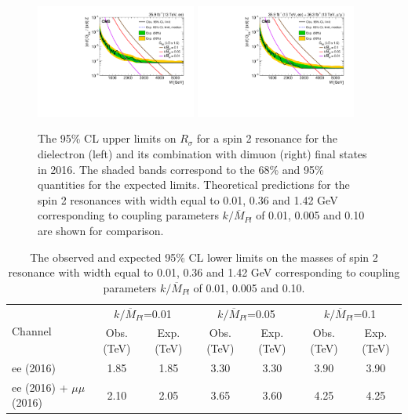 \begin{figure}[!htb]
\centering
\includegraphics[width=0.47\textwidth]{figures/Zprime/2016/paper/Figure_007-a.pdf}
\includegraphics[width=0.47\textwidth]{figures/Zprime/2016/paper/Figure_007-c.pdf}
 \caption{The 95\% CL upper limits on $R_\sigma$ for a spin 2 resonance for the dielectron (left) and its combination with dimuon (right) final states in 2016. The shaded bands correspond to the 68\% and 95\% quantities for the expected limits.  Theoretical predictions for the spin 2 resonances with width equal to 0.01, 0.36 and 1.42 GeV corresponding to coupling parameters $k/\overline{M}_{Pl}$ of 0.01, 0.005 and 0.10 are shown for comparison.}
\label{fig:limit_spin2}
\end{figure}


\begin{table}[!htb]
\begin{center}
\begin{tabular}{|l|c|c|c|c|c|c|}
\hline
\multirow{2}{*}{Channel}  & \multicolumn{2}{c|}{$k/\overline{M}_{Pl}$=0.01} & \multicolumn{2}{c|}{$k/\overline{M}_{Pl}$=0.05} & \multicolumn{2}{c|}{$k/\overline{M}_{Pl}$=0.1}  \\\cline{2-7}
                          & Obs. (TeV) & Exp. (TeV)                         & Obs. (TeV) & Exp. (TeV)                         & Obs. (TeV) & Exp. (TeV)    \\\hline
ee (2016)                 &  1.85      & 1.85                               & 3.30        & 3.30                              & 3.90       & 3.90          \\
ee (2016) + $\mu\mu$ (2016)& 2.10      & 2.05                               & 3.65        & 3.60                              & 4.25       & 4.25          \\
\hline
\end{tabular}
\caption{The observed and expected 95\% CL lower limits on the masses of spin 2 resonance with width equal to 0.01, 0.36 and 1.42 GeV corresponding to coupling parameters $k/\overline{M}_{Pl}$ of 0.01, 0.005 and 0.10.}
\label{tab:massLimitsSpin2}
\end{center}
\end{table}

